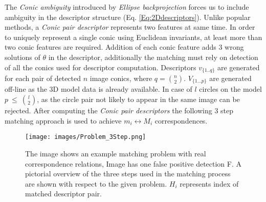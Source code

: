 \documentclass{bmvc2k}
\begin{document}
The \textit{Conic ambiguity} introduced by \textit{Ellipse backprojection} forces us to include ambiguity in the descriptor structure (Eq. \ref{Eq:2Ddescriptors}). 
Unlike popular methods, a \textit{Conic pair descriptor} represents two features at same time. 
In order to uniquely represent a single conic using Euclidean invariants, at least more than two conic features are required. 
Addition of each conic feature adds 3 wrong solutions of $ \theta $ in the descriptor, additionally the matching must rely on detection of all the conics used for descriptor computation. 
Descriptors $ v_{\{1..q\}} $ are generated for each pair of detected $ n $ image conics, where $ q = \binom{n}{2} $. 
$ V_{\{1...p\}} $ are generated off-line as the 3D model data is already available.
In case of $ l $ circles on the model $ p~\leq~\binom{l}{2} $, as the circle pair not likely to appear in the same image can be rejected. 
After computing the \textit{Conic pair descriptors} the following 3 step matching approach is used to achieve $ m_i \leftrightarrow M_i $ correspondences. 

\begin{figure}
\centering

\texttt{[image: images/Problem\_3Step.png]}
\caption{ The image shows an example matching problem with real correspondence relations, Image has one false positive detection F. A pictorial overview of the three steps used in the matching process are shown with respect to the given problem. %
$ H_i $ represents index of matched descriptor pair.  
\label{fig:matchingAndProblem}}
\end{figure}
\end{document}
